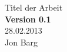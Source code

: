 \begin{titlepage}
	\vspace*{7cm}
	\begin{center}
		\Huge
		Titel der Arbeit\\
		\vspace{1cm}
		\large
		\textbf{Version 0.1}\\
		28.02.2013\\
		\vspace{2cm}
		Jon Barg \\
	\end{center}
	\normalsize
	\vfill
	
	
\end{titlepage}





%
%
